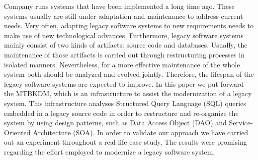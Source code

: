 Company runs systems that have been implemented a long time ago. These systems usually are still under adaptation and maintenance to address current needs. Very often, adapting legacy software systems to new requirements needs to make use of new technological advances. Furthermore, legacy software systems mainly consist of two kinds of artifacts: source code and databases. Usually, the maintenance of those artifacts is carried out through restructuring processes in isolated manners. Nevertheless, for a more effective maintenance of the whole system both should be analyzed and evolved jointly. Therefore, the lifespan of the legacy software systems are expected to improve. In this paper we put forward the MTBKDM, which is an infrastructure  to assist the modernization of a legacy system.%
This infrastructure analyses Structured Query Language (SQL) queries embedded in a legacy source code in order to restructure and re-organize the system by using design patterns, such as Data Access Object (DAO) and Service-Oriented Architecture (SOA). In  order to validate our approach we have carried out an experiment throughout a real-life case study. The results were promising regarding the effort employed to modernize a legacy software system.